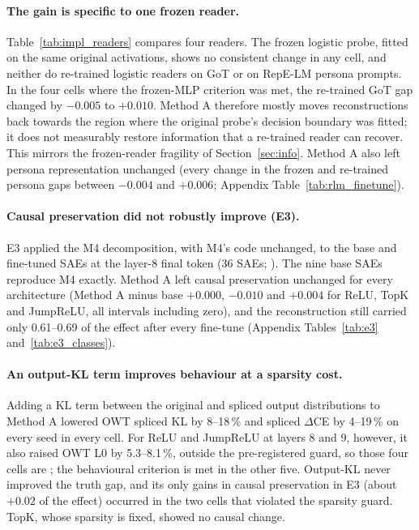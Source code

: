 \paragraph{The gain is specific to one frozen reader.} Table~\ref{tab:impl_readers} compares four readers. The frozen
logistic probe, fitted on the same original activations, shows no consistent change in any cell, and neither do
re-trained logistic readers on GoT or on RepE-LM persona prompts. In the four cells where the frozen-MLP criterion was
met, the re-trained GoT gap changed by $-0.005$ to $+0.010$. Method A therefore mostly moves reconstructions back towards
the region where the original probe's decision boundary was fitted; it does not measurably restore information that a
re-trained reader can recover. This mirrors the frozen-reader fragility of Section~\ref{sec:info}. Method A also left
persona representation unchanged (every change in the frozen and re-trained persona gaps between $-0.004$ and
$+0.006$; Appendix Table~\ref{tab:rlm_finetune}).

\paragraph{Causal preservation did not robustly improve (E3).} E3 applied the M4 decomposition, with M4's code
unchanged, to the base and fine-tuned SAEs at the layer-8 final token (36 SAEs; ). The nine base
SAEs reproduce M4 exactly. Method A left causal preservation unchanged for every architecture (Method A minus base
$+0.000$, $-0.010$ and $+0.004$ for ReLU, TopK and JumpReLU, all intervals including zero), and the reconstruction still
carried only 0.61--0.69 of the effect after every fine-tune (Appendix Tables~\ref{tab:e3} and~\ref{tab:e3_classes}).

\paragraph{An output-KL term improves behaviour at a sparsity cost.} Adding a KL term between the original and
spliced output distributions to Method A lowered OWT spliced KL by 8--18\,\% and spliced $\Delta$CE by 4--19\,\% on every
seed in every cell. For ReLU and JumpReLU at layers 8 and 9, however, it also raised OWT L0 by 5.3--8.1\,\%, outside the
pre-registered guard, so those four cells are ; the behavioural criterion is met in the other
five. Output-KL never improved the truth gap, and its only gains in causal preservation in E3 (about $+0.02$ of the
effect) occurred in the two cells that violated the sparsity guard. TopK, whose sparsity is fixed, showed no causal
change.

